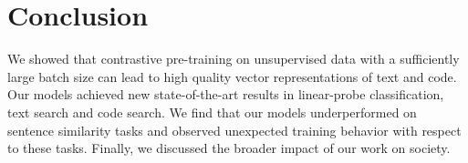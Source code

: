 \documentclass[nohyperref]{article}
\begin{document}
\section{Conclusion}
We showed that contrastive pre-training on unsupervised data with a sufficiently large batch size can lead to high quality vector representations of text and code. Our models achieved new state-of-the-art results in linear-probe classification, text search and code search. We find that our models underperformed on sentence similarity tasks and observed unexpected training behavior with respect to these tasks.  Finally, we discussed the broader impact of our work on society. 


\end{document}
